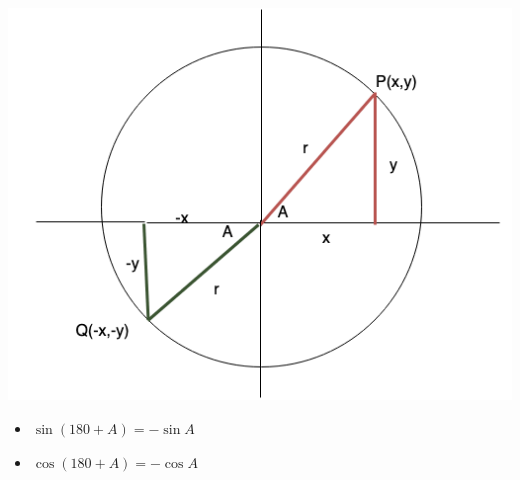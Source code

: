 \documentclass{book}
\begin{document}
	\includegraphics[scale=0.6]{180ptheta}
	
	\begin{mdframed}[backgroundcolor=yellow]
		\begin{itemize}
			\item$\sin(180+A) = -\sin{A}$
			\item $\cos(180+A) = -\cos{A}$
			
		\end{itemize}
	\end{mdframed}
	
\end{document}
